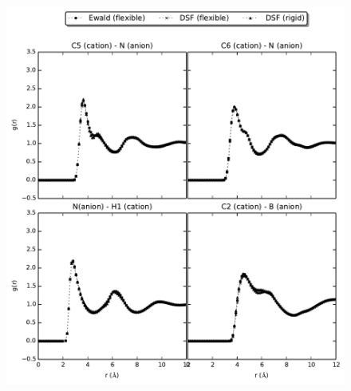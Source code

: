 \documentclass[3p,onecolumn]{elsarticle}
\begin{document}
\begin{figure}[ht]
\includegraphics[]{rdf-Weber.pdf}
\caption{\ce{[emim][B(CN)_4]}}
\label{fig:pressure}
\end{figure}
\end{document}
